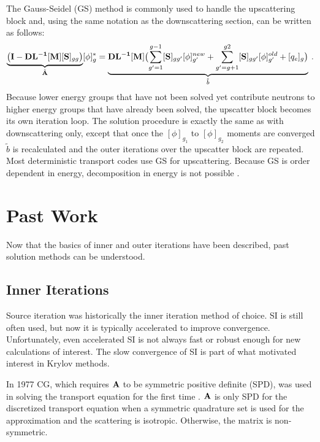 The Gauss-Seidel (GS) method is commonly used to handle the upscattering block and, using the same notation as the downscattering section, can be written as follows:
%
\begin{equation}
\underbrace{\bigl( \mathbf{I} - \mathbf{DL^{-1}}[\mathbf{M}][\mathbf{S}]_{gg} \bigr)}_{\tilde{\mathbf{A}}} [\phi]^{*}_{g} = \underbrace{\mathbf{DL^{-1}}[\mathbf{M}] \bigl( \sum_{g'=1}^{g-1}[\mathbf{S}]_{gg'}[\phi]^{new}_{g'} + \sum_{g'=g+1}^{g2} [\mathbf{S}]_{gg'}[\phi]^{old}_{g'}  + [q_{e}]_{g} \bigr)}_{\tilde{b}}  \:.
 \label{eq:up-GS}
\end{equation}
%
Because lower energy groups that have not been solved yet contribute neutrons to higher energy groups that have already been solved, the upscatter block becomes its own iteration loop. The solution procedure is exactly the same as with downscattering only, except that once the $[\phi]_{g_{1}}$ to $[\phi]_{g_{2}}$ moments are converged $\tilde{b}$ is recalculated and the outer iterations over the upscatter block are repeated. Most deterministic transport codes use GS for upscattering. Because GS is order dependent in energy, decomposition in energy is not possible \cite{Evans2009d}. 

\section{Past Work}
Now that the basics of inner and outer iterations have been described, past solution methods can be understood. 

\subsection{Inner Iterations}
Source iteration was historically the inner iteration method of choice. SI is still often used, but now it is typically accelerated to improve convergence. Unfortunately, even accelerated SI is not always fast or robust enough for new calculations of interest. The slow convergence of SI is part of what motivated interest in Krylov methods. 

In 1977 CG, which requires $\mathbf{A}$ to be symmetric positive definite (SPD), was used in solving the transport equation for the first time \cite{Lewis1977}. $\mathbf{A}$ is only SPD for the discretized transport equation when a symmetric quadrature set is used for the \Sn approximation and the scattering is isotropic. Otherwise, the matrix is non-symmetric. 

